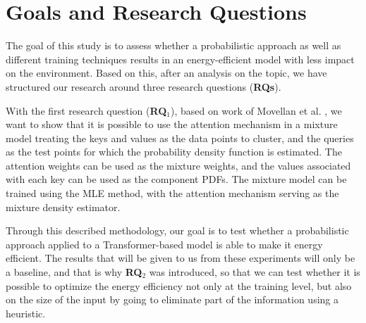 \section{Goals and Research Questions}
\label{goal}
The goal of this study is to assess whether a probabilistic approach as well as different training techniques results in an energy-efficient model with less impact on the environment. Based on this, after an analysis on the topic, we have structured our research around three research questions (\textbf{RQs}).

\medskip


\medskip
{}

\medskip
{}

\medskip

With the first research question (\textbf{RQ$_{1}$}), based on work of Movellan et al. \cite{DBLP:journals/corr/abs-2010-15583}, we want to show that it is possible to use the attention mechanism in a mixture model treating the keys and values as the data points to cluster, and the queries as the test points for which the probability density function is estimated. The attention weights can be used as the mixture weights, and the values associated with each key can be used as the component PDFs. The mixture model can be trained using the MLE method, with the attention mechanism serving as the mixture density estimator.

Through this described methodology, our goal is to test whether a probabilistic approach applied to a Transformer-based model is able to make it energy efficient. The results that will be given to us from these experiments will only be a baseline, and that is why \textbf{RQ$_{2}$} was introduced, so that we can test whether it is possible to optimize the energy efficiency not only at the training level, but also on the size of the input by going to eliminate part of the information using a heuristic. 

